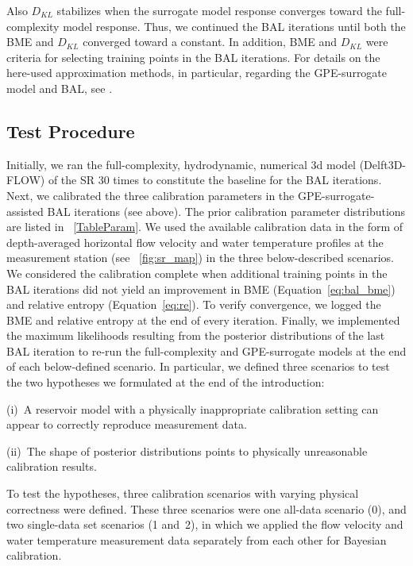 \documentclass[draft,linenumbers,onecolumn]{agujournal2019} %
\begin{document}
Also $D_{KL}$ stabilizes when the surrogate model response converges toward the full-complexity model response. Thus, we continued the BAL iterations until both the BME and $D_{KL}$ converged toward a constant. In addition, BME and $D_{KL}$ were criteria for selecting training points in the BAL iterations. For details on the here-used approximation methods, in particular, regarding the GPE-surrogate model and BAL, see .


\subsection{Test Procedure}
\label{sec:test-proc}

Initially, we ran the full-complexity, hydrodynamic, numerical 3d model (Delft3D-FLOW) of the SR 30 times to constitute the baseline for the BAL iterations. Next, we calibrated the three calibration parameters in the GPE-surrogate-assisted BAL iterations (see above). The prior calibration parameter distributions are listed in \tablename{~\ref{TableParam}}.
We used the available calibration data in the form of depth-averaged horizontal flow velocity and water temperature profiles at the measurement station (see \figurename{~\ref{fig:sr_map}}) in the three below-described scenarios. We considered the calibration complete when additional training points in the BAL iterations did not yield an improvement in BME (Equation~\ref{eq:bal_bme}) and relative entropy (Equation~\ref{eq:re}). To verify convergence, we logged the BME and relative entropy at the end of every iteration. Finally, we implemented the maximum likelihoods resulting from the posterior distributions of the last BAL iteration to re-run the full-complexity and GPE-surrogate models at the end of each below-defined scenario. In particular, we defined three scenarios to test the two hypotheses we formulated at the end of the introduction: 

(i)~A reservoir model with a physically inappropriate calibration setting can appear to correctly reproduce measurement data.

(ii)~The shape of posterior distributions points to physically unreasonable calibration results.

To test the hypotheses, three calibration scenarios with varying physical correctness were defined. These three scenarios were one all-data scenario (0), and two single-data set scenarios (1 and~2), in which we applied the flow velocity and water temperature measurement data separately from each other for Bayesian calibration.
\end{document}
